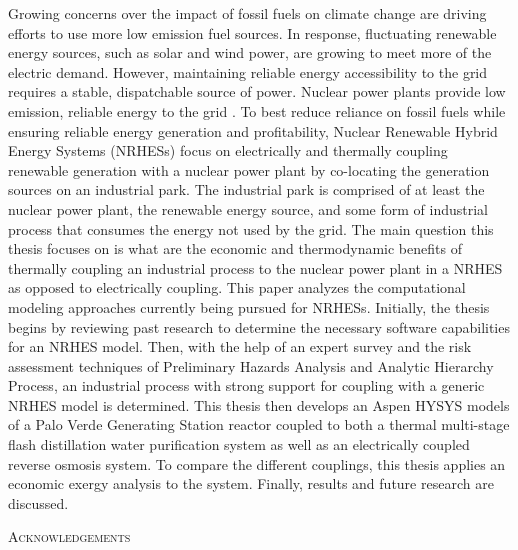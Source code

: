 \documentclass[12pt]{UIdahoMastersThesis}
\begin{document}
Growing concerns over the impact of fossil fuels on climate change are driving efforts to use more low emission fuel sources. In response, fluctuating renewable energy sources, such as solar and wind power, are growing to meet more of the electric demand. However, maintaining reliable energy accessibility to the grid requires a stable, dispatchable source of power. Nuclear power plants provide low emission, reliable energy to the grid \cite{IPCC}. To best reduce reliance on fossil fuels while ensuring reliable energy generation and profitability, Nuclear Renewable Hybrid Energy Systems (NRHESs) focus on electrically and thermally coupling renewable generation with a nuclear power plant by co-locating the generation sources on an industrial park. The industrial park is comprised of at least the nuclear power plant, the renewable energy source, and some form of industrial process that consumes the energy not used by the grid. The main question this thesis focuses on is what are the economic and thermodynamic benefits of thermally coupling an industrial process to the nuclear power plant in a NRHES as opposed to electrically coupling. This paper analyzes the computational modeling approaches currently being pursued for NRHESs. Initially, the thesis begins by reviewing past research to determine the necessary software capabilities for an NRHES model. Then, with the help of an expert survey and the risk assessment techniques of Preliminary Hazards Analysis and Analytic Hierarchy Process, an industrial process with strong support for coupling with a generic NRHES model is determined. This thesis then develops an Aspen HYSYS models of a Palo Verde Generating Station reactor coupled to both a thermal multi-stage flash distillation water purification system as well as an electrically coupled reverse osmosis system. To compare the different couplings, this thesis applies an economic exergy analysis to the system. Finally, results and future research are discussed.
\newpage

\begin{center}
 	{\LARGE\textsc{Acknowledgements}}
\end{center}
    
    
   
\end{document}
